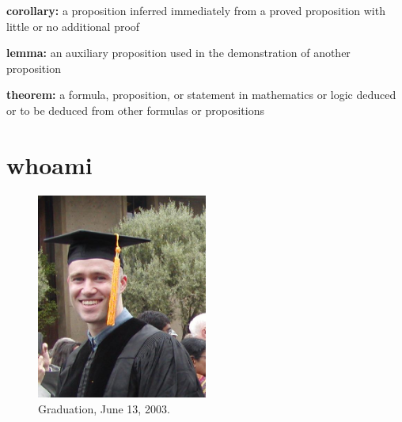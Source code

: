 \begin{description}
\item{\textbf{corollary:}}
  a proposition inferred immediately from a proved proposition with little 
  or no additional proof
\item{\textbf{lemma:}}
  an auxiliary proposition used in the demonstration of another proposition
\item{\textbf{theorem:}}
  a formula, proposition, or statement in mathematics or logic deduced or 
  to be deduced from other formulas or propositions
\end{description}


\raggedbottom
\chapter{whoami}
\flushbottom

\begin{figure}[h!]
  \begin{center}
    \includegraphics[width=0.5\textwidth]{appendix/graduation}
  \end{center}
  \caption{Graduation, June 13, 2003.}
  \label{figure graduation}
\end{figure}

\raggedbottom
